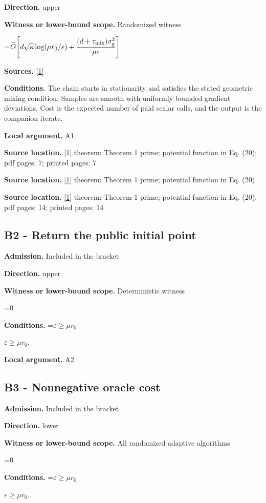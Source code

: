\documentclass[10pt,a4paper]{article}
\newcommand{\AtlasMath}[1]{\par\begingroup\centering\setbox0=\hbox{$\displaystyle #1$}\ifdim\wd0>1.4\linewidth\typeout{ATLAS WIDE FORMULA: \the\wd0}\fi\ifdim\wd0>\linewidth\resizebox{\linewidth}{!}{\box0}\else\box0\fi\par\endgroup}
\newcommand{\AtlasInlineMath}[1]{\begingroup\setbox0=\hbox{$#1$}\ifdim\wd0>.4\linewidth\endgroup\AtlasMath{#1}\else\endgroup$#1$\fi}
\begin{document}
\textbf{Direction.} upper

\textbf{Witness or lower-bound scope.} Randomized witness

\AtlasMath{\widetilde{O}\!\left[d\sqrt\kappa\log(\mu r_0/\varepsilon)+\frac{(d+\tau_{\rm mix})\sigma_g^2}{\mu\varepsilon}\right]}
\textbf{Sources.} \href{https://proceedings.mlr.press/v306/prokhorov26a.html}{[1]}

\textbf{Conditions.} The chain starts in stationarity and satisfies the stated geometric mixing condition. Samples are smooth with uniformly bounded gradient deviations. Cost is the expected number of paid scalar calls, and the output is the companion iterate.

\textbf{Local argument.} A1

\textbf{Source location.} \href{https://proceedings.mlr.press/v306/prokhorov26a.html}{[1]} theorem: Theorem 1 prime; potential function in Eq. (20); pdf pages: 7; printed pages: 7

\textbf{Source location.} \href{https://proceedings.mlr.press/v306/prokhorov26a.html}{[1]} theorem: Theorem 1 prime; potential function in Eq. (20)

\textbf{Source location.} \href{https://proceedings.mlr.press/v306/prokhorov26a.html}{[1]} theorem: Theorem 1 prime; potential function in Eq. (20); pdf pages: 14; printed pages: 14

\subsection{B2 - Return the public initial point}
\textbf{Admission.} Included in the bracket

\textbf{Direction.} upper

\textbf{Witness or lower-bound scope.} Deterministic witness

\AtlasMath{0}
\textbf{Conditions.} \AtlasInlineMath{\varepsilon\ge\mu r_0}.

\textbf{Local argument.} A2

\subsection{B3 - Nonnegative oracle cost}
\textbf{Admission.} Included in the bracket

\textbf{Direction.} lower

\textbf{Witness or lower-bound scope.} All randomized adaptive algorithms

\AtlasMath{0}
\textbf{Conditions.} \AtlasInlineMath{\varepsilon\ge\mu r_0}.
\end{document}
